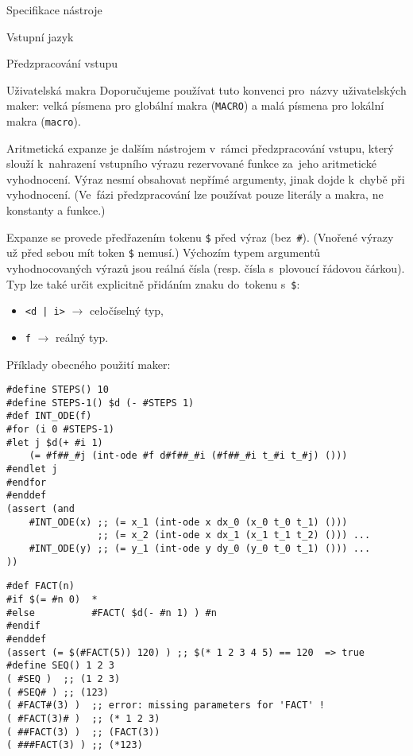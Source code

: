 \documentclass[thesis=M,czech]{FITthesis}[2012/06/26]
\newcommand{\id}[1]{\texttt{#1}}
\begin{document}
\begin{section}{Specifikace nástroje}
\begin{subsection}{Vstupní jazyk}
\begin{subsubsection}{Předzpracování vstupu}
\begin{paragraph}{Uživatelská makra}
Doporučujeme používat tuto konvenci pro~názvy uživatelských maker:
velká písmena pro globální makra (\id{MACRO})
a malá písmena pro lokální makra (\id{macro}).
\end{paragraph} %


\begin{paragraph}{Aritmetická expanze}\label{p:design:spec:ilang:macros:arith}
je dalším nástrojem v~rámci předzpracování vstupu,
který slouží k~nahrazení vstupního výrazu rezervované funkce
za~jeho aritmetické vyhodnocení.
Výraz nesmí obsahovat nepřímé argumenty,
jinak dojde k~chybě při vyhodnocení.
(Ve~fázi předzpracování lze používat pouze literály a makra,
ne konstanty a funkce.)

Expanze se provede předřazením tokenu \id{\$} před výraz (bez~\id{\#}).
(Vnořené výrazy už před sebou mít token \id{\$} nemusí.)
Výchozím typem argumentů vyhodnocovaných výrazů
jsou reálná čísla (resp. čísla s~plovoucí řádovou čárkou).
Typ lze také určit explicitně
přidáním znaku do~tokenu s~\id{\$}:
\begin{itemize}
\item \id{<d | i>} $\rightarrow$ celočíselný typ,
\item \id{f} $\rightarrow$ reálný typ.
\end{itemize}
\end{paragraph} %



\begin{paragraph}{Příklady obecného použití maker:}
\label{p:design:spec:ilang:macros:examples}
\begin{Verbatim}[samepage=true]
#define STEPS() 10
#define STEPS-1() $d (- #STEPS 1)
#def INT_ODE(f)
#for (i 0 #STEPS-1)
#let j $d(+ #i 1)
    (= #f##_#j (int-ode #f d#f##_#i (#f##_#i t_#i t_#j) ()))
#endlet j
#endfor
#enddef
(assert (and
    #INT_ODE(x) ;; (= x_1 (int-ode x dx_0 (x_0 t_0 t_1) ()))
                ;; (= x_2 (int-ode x dx_1 (x_1 t_1 t_2) ())) ...
    #INT_ODE(y) ;; (= y_1 (int-ode y dy_0 (y_0 t_0 t_1) ())) ...
))
\end{Verbatim}
\begin{Verbatim}[samepage=true]
#def FACT(n)
#if $(= #n 0)  *
#else          #FACT( $d(- #n 1) ) #n
#endif
#enddef
(assert (= $(#FACT(5)) 120) ) ;; $(* 1 2 3 4 5) == 120  => true
#define SEQ() 1 2 3
( #SEQ )  ;; (1 2 3)
( #SEQ# ) ;; (123)
( #FACT#(3) )  ;; error: missing parameters for 'FACT' !
( #FACT(3)# )  ;; (* 1 2 3)
( ##FACT(3) )  ;; (FACT(3))
( ###FACT(3) ) ;; (*123)
\end{Verbatim}
\end{paragraph} %


\end{subsubsection}
\end{subsection}
\end{section}
\end{document}
